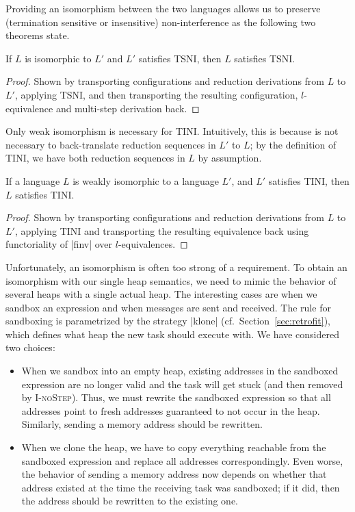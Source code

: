 Providing an isomorphism between the two languages allows us to
preserve (termination sensitive or insensitive) non-interference
as the following two theorems state.

\begin{theorem}
  \label{thm:iso-tsni}
  If $L$ is isomorphic to $L'$ and $L'$ satisfies TSNI, then
  $L$ satisfies TSNI.
\end{theorem}

\begin{proof}
  Shown by transporting configurations and reduction derivations from
  $L$ to $L'$, applying TSNI, and then transporting the
  resulting configuration, $l$-equivalence and multi-step derivation back.
\end{proof}

Only weak isomorphism is necessary for TINI. Intuitively, this is because
is not necessary to back-translate reduction sequences in $L'$ to
$L$; by the definition of TINI, we have both reduction sequences in $L$
by assumption.

\begin{theorem}
  \label{thm:iso-tini}
  If a language $L$ is weakly isomorphic to a language $L'$, and $L'$
  satisfies TINI, then $L$ satisfies TINI.
\end{theorem}

\begin{proof}
  Shown by transporting configurations and reduction derivations
  from $L$ to $L'$, applying TINI and transporting the resulting
  equivalence back using functoriality of |finv| over $l$-equivalences.
\end{proof}

Unfortunately, an isomorphism is often too strong of a requirement.
To obtain an isomorphism with our single heap semantics, we need to mimic the
behavior of several heaps with a single actual heap.
The interesting cases are when we sandbox
an expression and when messages are sent and received.
The rule for sandboxing is
parametrized by the strategy |klone| (cf.\ Section~\ref{sec:retrofit}),
which defines what heap the new task
should execute with.  We have considered two choices:

\begin{itemize}
    \item When we sandbox into an empty heap, existing addresses
in the sandboxed expression are no longer valid and the
task will get stuck (and then removed by \textsc{I-noStep}).
Thus, we must rewrite the sandboxed expression so that
all addresses point to fresh addresses
guaranteed to not occur in the heap.  Similarly,
sending a memory address should be rewritten.

\item When we clone the heap, we have to copy everything
reachable from the sandboxed expression and replace all addresses
correspondingly.  Even worse, the behavior of sending a memory address
now depends on whether that address existed at the time the receiving
task was sandboxed;  if it did, then the address should be rewritten to the
existing one.
\end{itemize}

